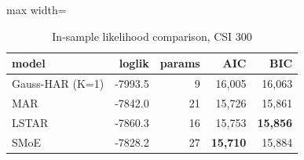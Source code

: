 \begin{table}[!htbp]\centering\small
\caption{In-sample likelihood comparison, CSI 300}\label{tab:csi300_lik}
\begin{adjustbox}{max width=\textwidth}
\begin{tabular}{lrrrr}
\toprule
model & loglik & params & AIC & BIC\\
\midrule
Gauss-HAR (K=1) & -7993.5 & 9 & 16,005 & 16,063\\
MAR & -7842.0 & 21 & 15,726 & 15,861\\
LSTAR & -7860.3 & 16 & 15,753 & \textbf{15,856}\\
SMoE & -7828.2 & 27 & \textbf{15,710} & 15,884\\
\bottomrule
\end{tabular}
\end{adjustbox}
\end{table}